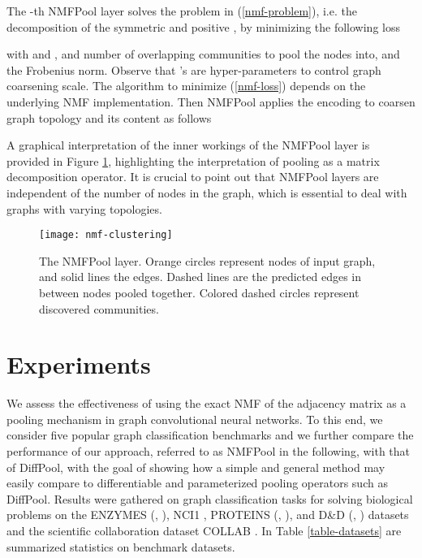 \documentclass[runningheads]{llncs}
\begin{document}
The -th NMFPool layer solves the problem in (\ref{nmf-problem}), i.e. the decomposition of the symmetric and positive , by minimizing the following loss

with  and , and  number of overlapping communities to pool the  nodes into, and  the Frobenius norm. Observe that 's are  hyper-parameters to control graph coarsening scale. The algorithm to minimize (\ref{nmf-loss}) depends on the underlying NMF implementation. Then NMFPool applies the encoding  to coarsen graph topology and its content as follows



A graphical interpretation of the inner workings of the NMFPool layer is provided in Figure \ref{figPool}, highlighting the interpretation of pooling as a matrix decomposition operator. It is crucial to point out that NMFPool layers are independent of the number of nodes in the graph, which is essential to deal with graphs with varying topologies.
\begin{figure}
\centering
\texttt{[image: nmf-clustering]}
\caption{The NMFPool layer. Orange circles represent nodes of input graph, and solid lines the edges. Dashed lines are the predicted edges in between nodes pooled together. Colored dashed circles represent discovered communities.} \label{figPool}
\end{figure}



\section{Experiments}

We assess the effectiveness of using the exact NMF of the adjacency matrix  as a pooling mechanism in graph convolutional neural networks. To this end, we consider five popular graph classification benchmarks and we further compare the performance of our approach, referred to as NMFPool in the following,  with that of DiffPool, with the goal of showing how a simple and general method may easily compare to differentiable and parameterized pooling operators such as DiffPool. Results were gathered on graph classification tasks for solving biological problems on the ENZYMES (\cite{borgwardt2005protein}, \cite{brenda_enzymes}),  NCI1 \cite{Wale:2008:CDS:1357641.1357642}, PROTEINS (\cite{borgwardt2005protein}, \cite{DOBSON2003771}), and D\&D (\cite{DOBSON2003771}, \cite{Shervashidze:2011:WGK:1953048.2078187}) datasets and the scientific collaboration dataset COLLAB \cite{Yanardag:2015:DGK:2783258.2783417}. In Table \ref{table-datasets} are summarized statistics on benchmark datasets.
\end{document}
